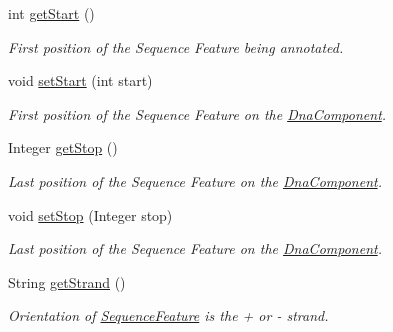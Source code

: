 \begin{DoxyCompactItemize}
int \hyperlink{classorg_1_1sbolstandard_1_1lib_s_b_o_lj_1_1_sequence_annotation_af715b30732f73f09c6ce4f201fd26f82}{getStart} ()
\begin{DoxyCompactList}\small\item\em First position of the Sequence Feature being annotated. \item\end{DoxyCompactList}\item 
void \hyperlink{classorg_1_1sbolstandard_1_1lib_s_b_o_lj_1_1_sequence_annotation_addc796c0e40fd97666692bc1a8fb4ddb}{setStart} (int start)
\begin{DoxyCompactList}\small\item\em First position of the Sequence Feature on the \hyperlink{classorg_1_1sbolstandard_1_1lib_s_b_o_lj_1_1_dna_component}{DnaComponent}. \item\end{DoxyCompactList}\item 
Integer \hyperlink{classorg_1_1sbolstandard_1_1lib_s_b_o_lj_1_1_sequence_annotation_a09477cdcbc577ed67d7febdc6c88530b}{getStop} ()
\begin{DoxyCompactList}\small\item\em Last position of the Sequence Feature on the \hyperlink{classorg_1_1sbolstandard_1_1lib_s_b_o_lj_1_1_dna_component}{DnaComponent}. \item\end{DoxyCompactList}\item 
void \hyperlink{classorg_1_1sbolstandard_1_1lib_s_b_o_lj_1_1_sequence_annotation_ab7a4aa665660144ec8b2cb0db4eede90}{setStop} (Integer stop)
\begin{DoxyCompactList}\small\item\em Last position of the Sequence Feature on the \hyperlink{classorg_1_1sbolstandard_1_1lib_s_b_o_lj_1_1_dna_component}{DnaComponent}. \item\end{DoxyCompactList}\item 
String \hyperlink{classorg_1_1sbolstandard_1_1lib_s_b_o_lj_1_1_sequence_annotation_af6151fa72051de5503b6aa42ed3736f3}{getStrand} ()
\begin{DoxyCompactList}\small\item\em Orientation of \hyperlink{classorg_1_1sbolstandard_1_1lib_s_b_o_lj_1_1_sequence_feature}{SequenceFeature} is the + or -\/ strand. \item\end{DoxyCompactList}\item 

\end{DoxyCompactItemize}
